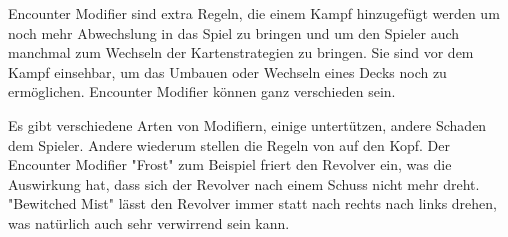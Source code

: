 Encounter Modifier sind extra Regeln, die einem Kampf hinzugefügt werden um noch mehr Abwechslung in das Spiel zu bringen
und um den Spieler auch manchmal zum Wechseln der Kartenstrategien zu bringen.
Sie sind vor dem Kampf einsehbar, um das Umbauen oder Wechseln eines Decks noch zu ermöglichen.
Encounter Modifier können ganz verschieden sein.

Es gibt verschiedene Arten von Modifiern, einige untertützen, andere Schaden dem Spieler. Andere wiederum stellen die Regeln von \FF auf den Kopf.
Der Encounter Modifier "Frost" zum Beispiel friert den Revolver ein, was die Auswirkung hat, dass sich der Revolver  nach einem Schuss nicht mehr dreht.
"Bewitched Mist" lässt den Revolver immer statt nach rechts nach links drehen, was natürlich auch sehr verwirrend sein kann.

\renewcommand{\kapitelautor}{}
